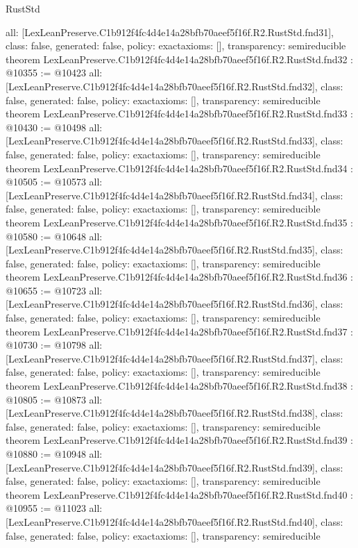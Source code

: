 \begin{lexlean}{RustStd}
\begin{coremodule}
{  all: [LexLeanPreserve.C1b912f4fc4d4e14a28bfb70aeef5f16f.R2.RustStd.fnd31],
  class: false,
  generated: false,
  policy: exact{axioms: []},
  transparency: semireducible
}
theorem LexLeanPreserve.C1b912f4fc4d4e14a28bfb70aeef5f16f.R2.RustStd.fnd32 : @10355 := @10423 {
  all: [LexLeanPreserve.C1b912f4fc4d4e14a28bfb70aeef5f16f.R2.RustStd.fnd32],
  class: false,
  generated: false,
  policy: exact{axioms: []},
  transparency: semireducible
}
theorem LexLeanPreserve.C1b912f4fc4d4e14a28bfb70aeef5f16f.R2.RustStd.fnd33 : @10430 := @10498 {
  all: [LexLeanPreserve.C1b912f4fc4d4e14a28bfb70aeef5f16f.R2.RustStd.fnd33],
  class: false,
  generated: false,
  policy: exact{axioms: []},
  transparency: semireducible
}
theorem LexLeanPreserve.C1b912f4fc4d4e14a28bfb70aeef5f16f.R2.RustStd.fnd34 : @10505 := @10573 {
  all: [LexLeanPreserve.C1b912f4fc4d4e14a28bfb70aeef5f16f.R2.RustStd.fnd34],
  class: false,
  generated: false,
  policy: exact{axioms: []},
  transparency: semireducible
}
theorem LexLeanPreserve.C1b912f4fc4d4e14a28bfb70aeef5f16f.R2.RustStd.fnd35 : @10580 := @10648 {
  all: [LexLeanPreserve.C1b912f4fc4d4e14a28bfb70aeef5f16f.R2.RustStd.fnd35],
  class: false,
  generated: false,
  policy: exact{axioms: []},
  transparency: semireducible
}
theorem LexLeanPreserve.C1b912f4fc4d4e14a28bfb70aeef5f16f.R2.RustStd.fnd36 : @10655 := @10723 {
  all: [LexLeanPreserve.C1b912f4fc4d4e14a28bfb70aeef5f16f.R2.RustStd.fnd36],
  class: false,
  generated: false,
  policy: exact{axioms: []},
  transparency: semireducible
}
theorem LexLeanPreserve.C1b912f4fc4d4e14a28bfb70aeef5f16f.R2.RustStd.fnd37 : @10730 := @10798 {
  all: [LexLeanPreserve.C1b912f4fc4d4e14a28bfb70aeef5f16f.R2.RustStd.fnd37],
  class: false,
  generated: false,
  policy: exact{axioms: []},
  transparency: semireducible
}
theorem LexLeanPreserve.C1b912f4fc4d4e14a28bfb70aeef5f16f.R2.RustStd.fnd38 : @10805 := @10873 {
  all: [LexLeanPreserve.C1b912f4fc4d4e14a28bfb70aeef5f16f.R2.RustStd.fnd38],
  class: false,
  generated: false,
  policy: exact{axioms: []},
  transparency: semireducible
}
theorem LexLeanPreserve.C1b912f4fc4d4e14a28bfb70aeef5f16f.R2.RustStd.fnd39 : @10880 := @10948 {
  all: [LexLeanPreserve.C1b912f4fc4d4e14a28bfb70aeef5f16f.R2.RustStd.fnd39],
  class: false,
  generated: false,
  policy: exact{axioms: []},
  transparency: semireducible
}
theorem LexLeanPreserve.C1b912f4fc4d4e14a28bfb70aeef5f16f.R2.RustStd.fnd40 : @10955 := @11023 {
  all: [LexLeanPreserve.C1b912f4fc4d4e14a28bfb70aeef5f16f.R2.RustStd.fnd40],
  class: false,
  generated: false,
  policy: exact{axioms: []},
  transparency: semireducible
}
\end{coremodule}
\end{lexlean}
